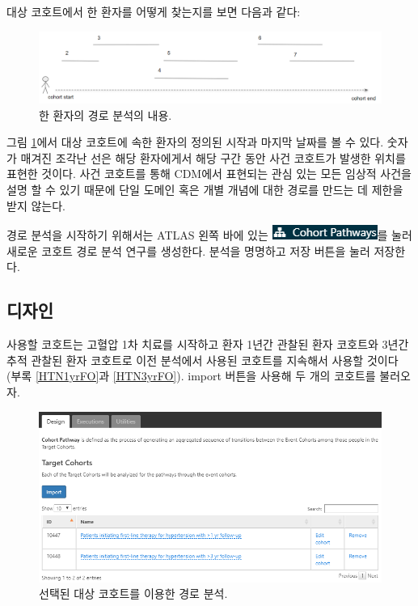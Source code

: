 \documentclass[10.5pt]{book}
\theoremstyle{definition}
\theoremstyle{definition}
\theoremstyle{definition}
\theoremstyle{remark}
\begin{document}
대상 코호트에서 한 환자를 어떻게 찾는지를 보면 다음과 같다:

\begin{figure}

{\centering \includegraphics[width=1\linewidth]{images/Characterization/pathwaysPersonEventView} 

}

\caption{한 환자의 경로 분석의 내용.}\label{fig:pathwaysPersonEventView}
\end{figure}

그림 \ref{fig:pathwaysPersonEventView}에서 대상 코호트에 속한 환자의
정의된 시작과 마지막 날짜를 볼 수 있다. 숫자가 매겨진 조각난 선은 해당
환자에게서 해당 구간 동안 사건 코호트가 발생한 위치를 표현한 것이다.
사건 코호트를 통해 CDM에서 표현되는 관심 있는 모든 임상적 사건을 설명 할
수 있기 때문에 단일 도메인 혹은 개별 개념에 대한 경로를 만드는 데 제한을
받지 않는다.

경로 분석을 시작하기 위해서는 ATLAS 왼쪽 바에 있는
\includegraphics{images/Characterization/atlasPathwaysMenuItem.png}를
눌러 새로운 코호트 경로 분석 연구를 생성한다. 분석을 명명하고 저장
버튼을 눌러 저장한다.

\subsection{디자인}

사용할 코호트는 고혈압 1차 치료를 시작하고 환자 1년간 관찰된 환자
코호트와 3년간 추적 관찰된 환자 코호트로 이전 분석에서 사용된 코호트를
지속해서 사용할 것이다 (부록 \ref{HTN1yrFO}과 \ref{HTN3yrFO}). import
버튼을 사용해 두 개의 코호트를 불러오자.

\begin{figure}

{\centering \includegraphics[width=1\linewidth]{images/Characterization/atlasPathwaysTargetCohorts} 

}

\caption{선택된 대상 코호트를 이용한 경로 분석.}\label{fig:atlasPathwaysTargetCohorts}
\end{figure}
\end{document}
